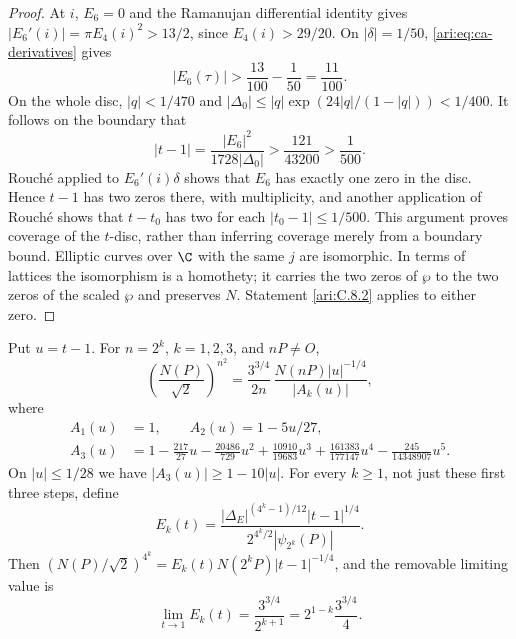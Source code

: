 \begin{proof}
At $i$, $E_6=0$ and the Ramanujan differential identity gives
$|E_6'(i)|=\pi E_4(i)^2>13/2$, since $E_4(i)>29/20$.
On $|\delta|=1/50$, \eqref{ari:eq:ca-derivatives} gives
\[
 |E_6(\tau)|>\frac{13}{100}-\frac1{50}=\frac{11}{100}.
\]
On the whole disc, $|q|<1/470$ and
$|\Delta_0|\le |q|\exp(24|q|/(1-|q|))<1/400$.
It follows on the boundary that
\[
 |t-1|=\frac{|E_6|^2}{1728|\Delta_0|}
 >\frac{121}{43200}>\frac1{500}.
\]
Rouch\'e applied to $E_6'(i)\delta$ shows that $E_6$ has
exactly one zero in the disc. Hence $t-1$ has two zeros there,
with multiplicity, and another application of Rouch\'e shows
that $t-t_0$ has two for each $|t_0-1|\le1/500$.
This argument proves coverage of the $t$-disc, rather than
inferring coverage merely from a boundary bound. Elliptic
curves over $\C$ with the same $j$ are isomorphic. In terms of
lattices the isomorphism is a homothety; it carries the two
zeros of $\wp$ to the two zeros of the scaled $\wp$ and
preserves $N$. Statement \ref{ari:C.8.2} applies to either zero.
\end{proof}

\begin{proposition}\label{ari:C.8.4}
Put $u=t-1$. For $n=2^k$, $k=1,2,3$, and $nP\ne O$,
\begin{equation}\label{ari:eq:ca-ladder}
 \left(\frac{N(P)}{\sqrt2}\right)^{n^2}
 =\frac{3^{3/4}}{2n}\,
       \frac{N(nP)|u|^{-1/4}}{|A_k(u)|},
\end{equation}
where
\begin{align*}
 A_1(u)&=1,\qquad A_2(u)=1-5u/27,\\
 A_3(u)&=1-\frac{217}{27}u-\frac{20486}{729}u^2
       +\frac{10910}{19683}u^3
       +\frac{161383}{177147}u^4
       -\frac{245}{14348907}u^5.
\end{align*}
On $|u|\le1/28$ we have $|A_3(u)|\ge1-10|u|$.
For every $k\ge1$, not just these first three steps, define
\[
 E_k(t)=\frac{|\Delta_E|^{(4^k-1)/12}|t-1|^{1/4}}
 {2^{4^k/2}|\psi_{2^k}(P)|}.
\]
Then $(N(P)/\sqrt2)^{4^k}=E_k(t)N(2^kP)|t-1|^{-1/4}$,
and the removable limiting value is
\[
 \lim_{t\to1}E_k(t)=\frac{3^{3/4}}{2^{k+1}}
                 =2^{1-k}\frac{3^{3/4}}4.
\]
\end{proposition}

